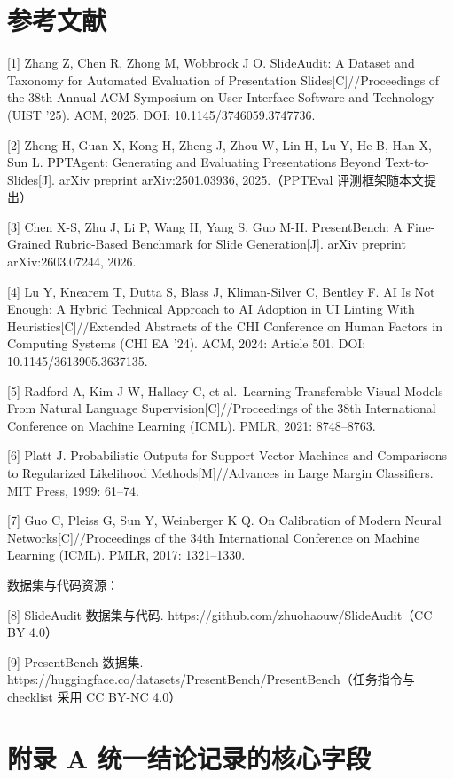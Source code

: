 \documentclass[
  11pt,
]{article}
\begin{document}
\section{参考文献}\label{ux53c2ux8003ux6587ux732e}

{[}1{]} Zhang Z, Chen R, Zhong M, Wobbrock J O. SlideAudit: A Dataset
and Taxonomy for Automated Evaluation of Presentation
Slides{[}C{]}//Proceedings of the 38th Annual ACM Symposium on User
Interface Software and Technology (UIST '25). ACM, 2025. DOI:
10.1145/3746059.3747736.

{[}2{]} Zheng H, Guan X, Kong H, Zheng J, Zhou W, Lin H, Lu Y, He B, Han
X, Sun L. PPTAgent: Generating and Evaluating Presentations Beyond
Text-to-Slides{[}J{]}. arXiv preprint arXiv:2501.03936, 2025.（PPTEval
评测框架随本文提出）

{[}3{]} Chen X-S, Zhu J, Li P, Wang H, Yang S, Guo M-H. PresentBench: A
Fine-Grained Rubric-Based Benchmark for Slide Generation{[}J{]}. arXiv
preprint arXiv:2603.07244, 2026.

{[}4{]} Lu Y, Knearem T, Dutta S, Blass J, Kliman-Silver C, Bentley F.
AI Is Not Enough: A Hybrid Technical Approach to AI Adoption in UI
Linting With Heuristics{[}C{]}//Extended Abstracts of the CHI Conference
on Human Factors in Computing Systems (CHI EA '24). ACM, 2024: Article
501. DOI: 10.1145/3613905.3637135.

{[}5{]} Radford A, Kim J W, Hallacy C, et al.~Learning Transferable
Visual Models From Natural Language Supervision{[}C{]}//Proceedings of
the 38th International Conference on Machine Learning (ICML). PMLR,
2021: 8748--8763.

{[}6{]} Platt J. Probabilistic Outputs for Support Vector Machines and
Comparisons to Regularized Likelihood Methods{[}M{]}//Advances in Large
Margin Classifiers. MIT Press, 1999: 61--74.

{[}7{]} Guo C, Pleiss G, Sun Y, Weinberger K Q. On Calibration of Modern
Neural Networks{[}C{]}//Proceedings of the 34th International Conference
on Machine Learning (ICML). PMLR, 2017: 1321--1330.

数据集与代码资源：

{[}8{]} SlideAudit 数据集与代码.
https://github.com/zhuohaouw/SlideAudit（CC BY 4.0）

{[}9{]} PresentBench 数据集.
https://huggingface.co/datasets/PresentBench/PresentBench（任务指令与
checklist 采用 CC BY-NC 4.0）

\section{附录 A
统一结论记录的核心字段}\label{ux9644ux5f55-a-ux7edfux4e00ux7ed3ux8bbaux8bb0ux5f55ux7684ux6838ux5fc3ux5b57ux6bb5}
\end{document}
